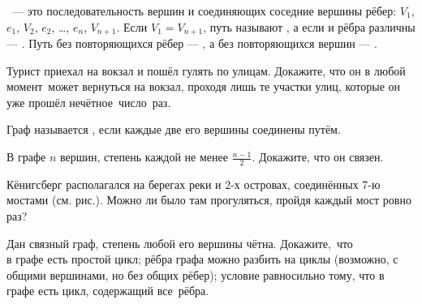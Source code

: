 \documentclass[12pt,a4paper]{article}
\begin{document}
\ --- это последовательность вершин и соединяющих соседние вершины рёбер:
$V_1$, $e_1$, $V_2$, $e_2$, \dots, $e_n$, $V_{n+1}$. %
Если $V_1=V_{n+1}$, путь называют ,
а если и рёбра различны --- .
Путь без повторяющихся рёбер --- , а без повторяющихся вершин --- .

Турист приехал на вокзал и пошёл гулять по улицам. Докажите, что он в любой момент~может вернуться на вокзал, проходя лишь те участки улиц, которые он уже прошёл нечётное~\hbox{число~раз.}


Граф называется , если каждые две его вершины соединены путём.

В графе $n$ вершин, степень каждой не менее $\frac{n-1}{2}$. Докажите, что он связен.

Кёнигсберг располагался на берегах реки и 2-х островах, соединённых 7-ю мостами (см. рис.).
Можно ли было там прогуляться, %
пройдя каждый мост ровно раз?

Дан связный граф, степень любой его вершины чётна. Докажите,~что
\\
 в графе есть простой цикл;
 рёбра графа можно разбить на циклы
(возможно, с общими вершинами, но без общих рёбер);
 условие равносильно тому, что в графе есть цикл, содержащий все~рёбра.




\end{document}
